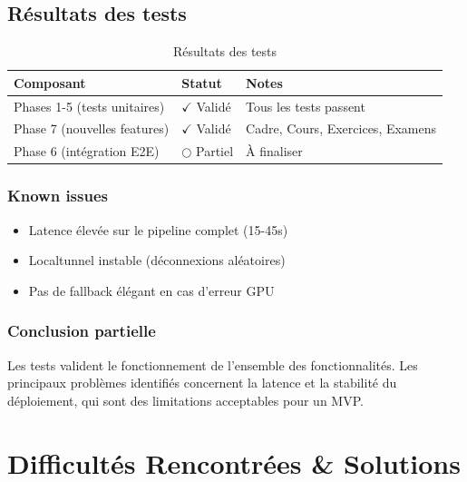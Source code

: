 \documentclass[12pt,a4paper]{report}
\begin{document}
\section{Résultats des tests}
\begin{table}[h!]
    \centering
    \begin{tabular}{p{5cm} p{5cm} p{4cm}}
        \toprule
        \textbf{Composant} & \textbf{Statut} & \textbf{Notes} \\
        \midrule
        Phases 1-5 (tests unitaires) & $\checkmark$ Validé & Tous les tests passent \\
        Phase 7 (nouvelles features) & $\checkmark$ Validé & Cadre, Cours, Exercices, Examens \\
        Phase 6 (intégration E2E) & $\bigcirc$ Partiel & À finaliser \\
        \bottomrule
    \end{tabular}
    \caption{Résultats des tests}
\end{table}

\subsection{Known issues}
\begin{itemize}
    \item Latence élevée sur le pipeline complet (15-45s)
    \item Localtunnel instable (déconnexions aléatoires)
    \item Pas de fallback élégant en cas d'erreur GPU
\end{itemize}

\subsection*{Conclusion partielle}
Les tests valident le fonctionnement de l'ensemble des fonctionnalités. Les principaux problèmes identifiés concernent la latence et la stabilité du déploiement, qui sont des limitations acceptables pour un MVP.

\chapter{Difficultés Rencontrées \& Solutions}
\end{document}
